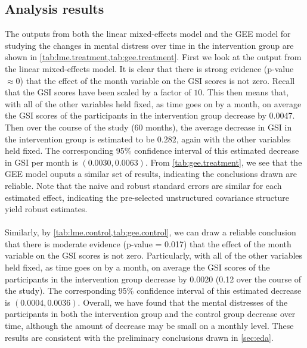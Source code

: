 \subsection{Analysis results}\label{sec:analysis.results}
The outputs from both the linear mixed-effects model and the GEE model for studying the changes in mental distress over time in the intervention group are shown in \cref{tab:lme.treatment,tab:gee.treatment}. First we look at the output from the linear mixed-effects model. It is clear that there is strong evidence (p-value $\approx 0$) that the effect of the month variable on the GSI scores is not zero. Recall that the GSI scores have been scaled by a factor of $10$. This then means that, with all of the other variables held fixed, as time goes on by a month, on average the GSI scores of the participants in the intervention group decrease by 0.0047. Then over the course of the study (60 months), the average decrease in GSI in the intervention group is estimated to be $0.282$, again with the other variables held fixed. The corresponding 95\% confidence interval of this estimated decrease in GSI per month is $(0.0030, 0.0063)$. From \cref{tab:gee.treatment}, we see that the GEE model ouputs a similar set of results, indicating the conclusions drawn are reliable. Note that the naive and robust standard errors are similar for each estimated effect, indicating the pre-selected unstructured covariance structure yield robust estimates.\\\\
Similarly, by \cref{tab:lme.control,tab:gee.control}, we can draw a reliable conclusion that there is moderate evidence (p-value = 0.017) that the effect of the month variable on the GSI scores is not zero. Particularly, with all of the other variables held fixed, as time goes on by a month, on average the GSI scores of the participants in the intervention group decrease by 0.0020 (0.12 over the course of the study). The corresponding 95\% confidence interval of this estimated decrease is $(0.0004, 0.0036)$. Overall, we have found that the mental distresses of the participants in both the intervention group and the control group decrease over time, although the amount of decrease may be small on a monthly level. These results are consistent with the preliminary conclusions drawn in \cref{sec:eda}.\\
